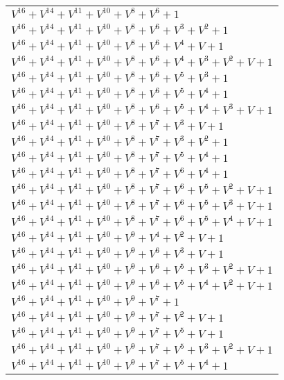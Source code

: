 \documentclass[12pt]{article}
\begin{document}
\begin{adjustwidth}{-4cm}{}
\begin{center}
\begin{longtable}{|l|}
$V^{16}  +V^{14}  +V^{11}  +V^{10}  +V^{8}  +V^{6}  + 1$ \\
$V^{16}  +V^{14}  +V^{11}  +V^{10}  +V^{8}  +V^{6}  +V^{3}  +V^{2}  + 1$ \\
$V^{16}  +V^{14}  +V^{11}  +V^{10}  +V^{8}  +V^{6}  +V^{4}  + V + 1$ \\
$V^{16}  +V^{14}  +V^{11}  +V^{10}  +V^{8}  +V^{6}  +V^{4}  +V^{3}  +V^{2}  + V + 1$ \\
$V^{16}  +V^{14}  +V^{11}  +V^{10}  +V^{8}  +V^{6}  +V^{5}  +V^{3}  + 1$ \\
$V^{16}  +V^{14}  +V^{11}  +V^{10}  +V^{8}  +V^{6}  +V^{5}  +V^{4}  + 1$ \\
$V^{16}  +V^{14}  +V^{11}  +V^{10}  +V^{8}  +V^{6}  +V^{5}  +V^{4}  +V^{3}  + V + 1$ \\
$V^{16}  +V^{14}  +V^{11}  +V^{10}  +V^{8}  +V^{7}  +V^{3}  + V + 1$ \\
$V^{16}  +V^{14}  +V^{11}  +V^{10}  +V^{8}  +V^{7}  +V^{3}  +V^{2}  + 1$ \\
$V^{16}  +V^{14}  +V^{11}  +V^{10}  +V^{8}  +V^{7}  +V^{5}  +V^{4}  + 1$ \\
$V^{16}  +V^{14}  +V^{11}  +V^{10}  +V^{8}  +V^{7}  +V^{6}  +V^{4}  + 1$ \\
$V^{16}  +V^{14}  +V^{11}  +V^{10}  +V^{8}  +V^{7}  +V^{6}  +V^{5}  +V^{2}  + V + 1$ \\
$V^{16}  +V^{14}  +V^{11}  +V^{10}  +V^{8}  +V^{7}  +V^{6}  +V^{5}  +V^{3}  + V + 1$ \\
$V^{16}  +V^{14}  +V^{11}  +V^{10}  +V^{8}  +V^{7}  +V^{6}  +V^{5}  +V^{4}  + V + 1$ \\
$V^{16}  +V^{14}  +V^{11}  +V^{10}  +V^{9}  +V^{4}  +V^{2}  + V + 1$ \\
$V^{16}  +V^{14}  +V^{11}  +V^{10}  +V^{9}  +V^{6}  +V^{3}  + V + 1$ \\
$V^{16}  +V^{14}  +V^{11}  +V^{10}  +V^{9}  +V^{6}  +V^{5}  +V^{3}  +V^{2}  + V + 1$ \\
$V^{16}  +V^{14}  +V^{11}  +V^{10}  +V^{9}  +V^{6}  +V^{5}  +V^{4}  +V^{2}  + V + 1$ \\
$V^{16}  +V^{14}  +V^{11}  +V^{10}  +V^{9}  +V^{7}  + 1$ \\
$V^{16}  +V^{14}  +V^{11}  +V^{10}  +V^{9}  +V^{7}  +V^{2}  + V + 1$ \\
$V^{16}  +V^{14}  +V^{11}  +V^{10}  +V^{9}  +V^{7}  +V^{5}  + V + 1$ \\
$V^{16}  +V^{14}  +V^{11}  +V^{10}  +V^{9}  +V^{7}  +V^{5}  +V^{3}  +V^{2}  + V + 1$ \\
$V^{16}  +V^{14}  +V^{11}  +V^{10}  +V^{9}  +V^{7}  +V^{5}  +V^{4}  + 1$ \\

\end{longtable}
\end{center}
\end{adjustwidth}
\end{document}
